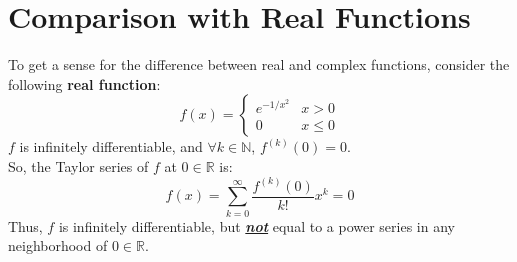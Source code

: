 \section{Comparison with Real Functions}

\begin{example}
    To get a sense for the difference between real and complex functions, consider the following \textbf{real function}:
    \begin{equation}
        f(x) = \begin{cases}
            e^{-1/x^2} & x > 0    \\
            0          & x \leq 0
        \end{cases}
    \end{equation}
    $f$ is infinitely differentiable, and $\forall k \in \mathbb{N}$, $f^{(k)}(0) = 0$.\\
    So, the Taylor series of $f$ at $0 \in \mathbb{R}$ is:
    \begin{equation}
        f(x) = \sum_{k=0}^{\infty} \frac{f^{(k)}(0)}{k!} x^k = 0
    \end{equation}
    Thus, $f$ is infinitely differentiable, but \textbf{\underline{\textit{not}}} equal to a power series in any neighborhood of $0\in \mathbb{R}$.
\end{example}